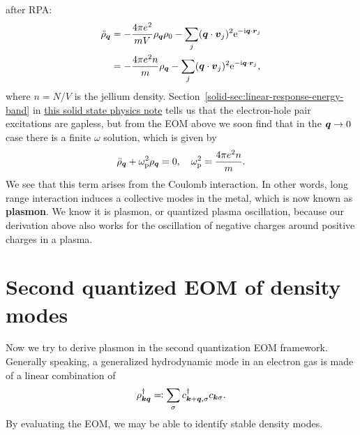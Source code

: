 \documentclass[hyperref, a4paper]{article}
\newcommand*{\ii}{\mathrm{i}}
\newcommand*{\ee}{\mathrm{e}}
\newcommand*{\concept}[1]{{\textbf{#1}}}
\newcommand{\soliddoc}{\href{../solid/solid.pdf}{this solid state physics note}}
\begin{document}
after RPA:
\begin{equation}
    \begin{aligned}
        \ddot{\rho}_{\vb*{q}} &= - \frac{4 \pi e^2}{mV} \rho_{\vb*{q}} \rho_{0} - \sum_j (\vb*{q} \cdot \vb*{v}_j)^2 \ee^{- \ii \vb*{q} \cdot \vb*{r}_j} \\
        &= - \frac{4 \pi e^2 n}{m} \rho_{\vb*{q}} - \sum_j (\vb*{q} \cdot \vb*{v}_j)^2 \ee^{- \ii \vb*{q} \cdot \vb*{r}_j} ,
    \end{aligned}
\end{equation}  
where $n = N / V$ is the jellium density. Section~\eqref{solid-sec:linear-response-energy-band} in \soliddoc{} 
tells us that the electron-hole pair excitations are gapless, but from the EOM above we soon find that in the 
$\vb*{q} \to 0$ case there is a finite $\omega$ solution, which is given by 
\begin{equation}
    \ddot{\rho}_{\vb*{q}} + \omega_\text{p}^2 \rho_{\vb*{q}} = 0, \quad \omega_\text{p}^2 = \frac{4 \pi e^2 n}{m}.
\end{equation}
We see that this term arises from the Coulomb interaction. In other words, long range interaction induces a 
collective modes in the metal, which is now known as \concept{plasmon}. We know it is plasmon, or quantized 
plasma oscillation, because our derivation above also works for the oscillation of negative charges around 
positive charges in a plasma.

\section{Second quantized EOM of density modes}

Now we try to derive plasmon in the second quantization EOM framework. Generally speaking, a generalized 
hydrodynamic mode in an electron gas is made of a linear combination of 
\begin{equation}
    \rho_{\vb*{k} \vb*{q}}^\dagger \eqqcolon \sum_\sigma c^\dagger_{\vb*{k} + \vb*{q}, \sigma} c_{\vb*{k} \sigma}.
\end{equation}
By evaluating the EOM, we may be able to identify stable density modes.
\end{document}
